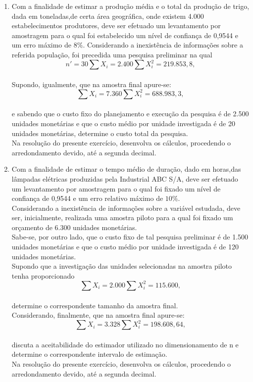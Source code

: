 \begin{enumerate}[resume]
\item Com a finalidade de estimar a produção média e o total da produção de trigo, dada em toneladas,de certa área geográfica, onde existem 4.000 estabelecimentos produtores, deve ser efetuado um levantamento por amostragem para o qual foi estabelecido um nível de confiança de 0,9544 e um erro máximo de $8\%$. Considerando a inexistência de informações sobre a referida população, foi precedida uma pesquisa preliminar na qual\\
$$n' = 30 \sum X_{i} = 2.400  \sum X_{i}^{2} = 219.853,8,$$\\
Supondo, igualmente, que na amostra final apure-se:\\
$$\sum X_{i} = 7.360  \sum X_{i}^{2} = 688.983,3,$$\\
e sabendo que o custo fixo do planejamento e execução da pesquisa é de 2.500 unidades monetárias e que o custo médio por unidade investigada é de 20 unidades monetárias, determine o custo total da pesquisa.\\
Na resolução do presente exercício, desenvolva os cálculos, procedendo o arredondamento devido, até a segunda decimal.

\item Com a finalidade de estimar o tempo médio de duração, dado em horas,das lâmpadas elétricas produzidas pela Industrial ABC S/A, deve ser efetuado um levantamento por amostragem para o qual foi fixado um nível de confiança de 0,9544 e um erro relativo máximo de $10\%$.\\
Considerando a inexistência de informações sobre a variável estudada, deve ser, inicialmente, realizada uma amostra piloto para a qual foi fixado um orçamento de 6.300 unidades monetárias.\\
Sabe-se, por outro lado, que o custo fixo de tal pesquisa preliminar é de 1.500 unidades monetárias e que o custo médio por unidade investigada é de 120 unidades monetárias.\\
Supondo que a investigação das unidades selecionadas na amostra piloto tenha proporcionado\\
$$\sum X_{i} = 2.000  \sum X_{i}^{2} = 115.600,$$\\
determine o correspondente tamanho da amostra final.\\
Considerando, finalmente, que na amostra final apure-se:\\
$$\sum X_{i} = 3.328  \sum X_{i}^{2} = 198.608,64,$$\\
discuta a aceitabilidade do estimador utilizado no dimensionamento de n e determine o correspondente intervalo de estimação.\\
Na resolução do presente exercício, desenvolva os cálculos, procedendo o arredondamento devido, até a segunda decimal.


\end{enumerate}

